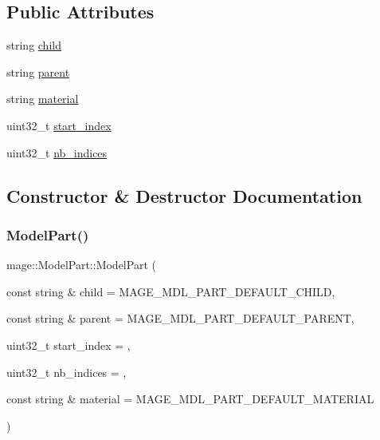 \subsection*{Public Attributes}
\begin{DoxyCompactItemize}
\item 
string \hyperlink{structmage_1_1_model_part_a3ab6e2faae44453d60cf0ff4876f49eb}{child}
\item 
string \hyperlink{structmage_1_1_model_part_abd5387d6a21aa47bce04565c5333f83e}{parent}
\item 
string \hyperlink{structmage_1_1_model_part_a4b0bfbb9ac313b6ffe8a8a3ee27469fd}{material}
\item 
uint32\+\_\+t \hyperlink{structmage_1_1_model_part_af889f5bd847555d544d0ee07187e0115}{start\+\_\+index}
\item 
uint32\+\_\+t \hyperlink{structmage_1_1_model_part_a4b7d8beddffa117e1f6829e6c9acfce3}{nb\+\_\+indices}
\end{DoxyCompactItemize}


\subsection{Constructor \& Destructor Documentation}
\hypertarget{structmage_1_1_model_part_a4a9443af884ad45625f894ae33eaac32}{}\label{structmage_1_1_model_part_a4a9443af884ad45625f894ae33eaac32} 
\subsubsection{\texorpdfstring{Model\+Part()}{ModelPart()}\hspace{0.1cm}{\footnotesize\ttfamily [1/3]}}
{\footnotesize\ttfamily mage\+::\+Model\+Part\+::\+Model\+Part (\begin{DoxyParamCaption}\item[{const string \&}]{child = {\ttfamily MAGE\+\_\+MDL\+\_\+PART\+\_\+DEFAULT\+\_\+CHILD},  }\item[{const string \&}]{parent = {\ttfamily MAGE\+\_\+MDL\+\_\+PART\+\_\+DEFAULT\+\_\+PARENT},  }\item[{uint32\+\_\+t}]{start\+\_\+index = {},  }\item[{uint32\+\_\+t}]{nb\+\_\+indices = {},  }\item[{const string \&}]{material = {\ttfamily MAGE\+\_\+MDL\+\_\+PART\+\_\+DEFAULT\+\_\+MATERIAL} }\end{DoxyParamCaption})\hspace{0.3cm}{\ttfamily [explicit]}}

